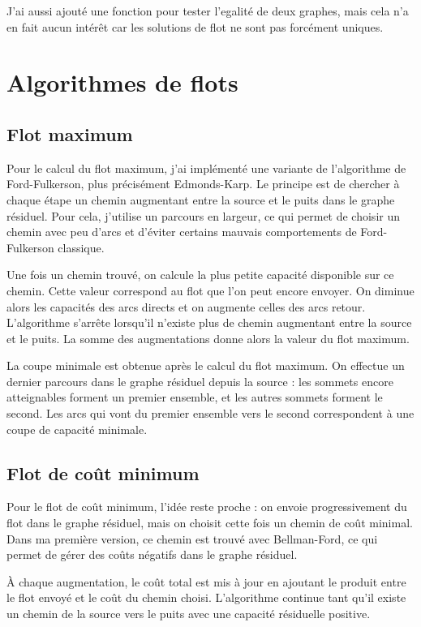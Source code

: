 \documentclass{rapportClass}
\begin{document}
J'ai aussi ajouté une fonction pour tester l'egalité de deux graphes, mais cela n'a en fait aucun intérêt car les solutions de flot ne sont pas forcément uniques.


\chapter{Algorithmes de flots}
\section{Flot maximum}
Pour le calcul du flot maximum, j'ai implémenté une variante de l'algorithme de Ford-Fulkerson, plus précisément Edmonds-Karp. Le principe est de chercher à chaque étape un chemin augmentant entre la source et le puits dans le graphe résiduel. Pour cela, j'utilise un parcours en largeur, ce qui permet de choisir un chemin avec peu d'arcs et d'éviter certains mauvais comportements de Ford-Fulkerson classique.

Une fois un chemin trouvé, on calcule la plus petite capacité disponible sur ce chemin. Cette valeur correspond au flot que l'on peut encore envoyer. On diminue alors les capacités des arcs directs et on augmente celles des arcs retour. L'algorithme s'arrête lorsqu'il n'existe plus de chemin augmentant entre la source et le puits. La somme des augmentations donne alors la valeur du flot maximum.

La coupe minimale est obtenue après le calcul du flot maximum. On effectue un dernier parcours dans le graphe résiduel depuis la source : les sommets encore atteignables forment un premier ensemble, et les autres sommets forment le second. Les arcs qui vont du premier ensemble vers le second correspondent à une coupe de capacité minimale.

\section{Flot de coût minimum}
Pour le flot de coût minimum, l'idée reste proche : on envoie progressivement du flot dans le graphe résiduel, mais on choisit cette fois un chemin de coût minimal. Dans ma première version, ce chemin est trouvé avec Bellman-Ford, ce qui permet de gérer des coûts négatifs dans le graphe résiduel.

À chaque augmentation, le coût total est mis à jour en ajoutant le produit entre le flot envoyé et le coût du chemin choisi. L'algorithme continue tant qu'il existe un chemin de la source vers le puits avec une capacité résiduelle positive.
\end{document}
